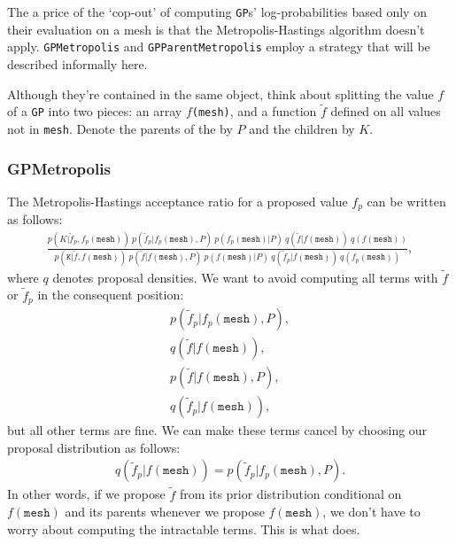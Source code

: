 \documentclass[]{manual}
\begin{document}
The a price of the `cop-out' of computing \texttt{GP}s' log-probabilities based only on their evaluation on a mesh is that the Metropolis-Hastings algorithm doesn't apply. \texttt{GPMetropolis} and \texttt{GPParentMetropolis} employ a strategy that will be described informally here.

Although they're contained in the same object, think about splitting the value $f$ of a \texttt{GP} into two pieces: an array $f$\texttt{(mesh)}, and a function $\tilde f$ defined on all values not in \texttt{mesh}. Denote the parents of the  by $P$ and the children by $K$.

\subsubsection{GPMetropolis}
The Metropolis-Hastings acceptance ratio for a proposed value $f_p$ can be written as follows:
\begin{eqnarray*}
    \frac{p(K|\tilde f_p, f_p(\mathtt{mesh}))\ p(\tilde f_p|f_p(\mathtt{mesh}), P)\ p(f_p(\mathtt{mesh}) | P)\ q(\tilde f|f(\mathtt{mesh}))\ q(f(\mathtt{mesh}))}{p(\mathtt{K}|\tilde f, f(\mathtt{mesh}))\ p(\tilde f|f(\mathtt{mesh}), P)\ p(f(\mathtt{mesh}) | P)\ q(\tilde f_p|f(\mathtt{mesh}))\ q(f_p(\mathtt{mesh}))},
\end{eqnarray*}
where $q$ denotes proposal densities. We want to avoid computing all terms with $\tilde f$ or $\tilde f_p$ in the consequent position:
\begin{eqnarray*}
    p(\tilde f_p|f_p(\texttt{mesh}), P),\\ q(\tilde f|f(\texttt{mesh})),\\ p(\tilde f|f(\texttt{mesh}), P),\\ q(\tilde f_p|f(\texttt{mesh})),
\end{eqnarray*}
but all other terms are fine. We can make these terms cancel by choosing our proposal distribution as follows:
\begin{eqnarray*}
    q(\tilde f_p|f(\texttt{mesh})) = p(\tilde f_p|f_p(\texttt{mesh}), P).
\end{eqnarray*}
In other words, if we propose $\tilde f$ from its prior distribution conditional on $f(\texttt{mesh})$ and its parents whenever we propose $f(\texttt{mesh})$, we don't have to worry about computing the intractable terms. This is what  does.
\end{document}
